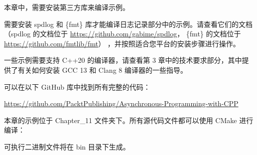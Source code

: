 本章中，需要安装第三方库来编译示例。

需要安装 spdlog 和 \{fmt\} 库才能编译日志记录部分中的示例。请查看它们的文档（spdlog 的文档位于 \url{https://github.com/gabime/spdlog}， \{fmt\} 的文档位于 \url{https://github.com/fmtlib/fmt}） ，并按照适合您平台的安装步骤进行操作。

一些示例需要支持 C++20 的编译器，请查看第 3 章中的技术要求部分，其中提供了有关如何安装 GCC 13 和 Clang 8 编译器的一些指导。

可以在以下 GitHub 库中找到所有完整的代码：

\url{https://github.com/PacktPublishing/Asynchronous-Programming-with-CPP}

本章的示例位于 Chapter\_11 文件夹下。所有源代码文件都可以使用 CMake 进行编译：


可执行二进制文件将在 bin 目录下生成。
